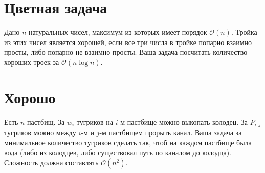 \documentclass[addpoints]{exam}
\begin{document}
\section{Цветная задача}

Дано $n$ натуральных чисел, максимум из которых имеет порядок $\mathcal{O}(n)$. Тройка из этих чисел является хорошей, если все три числа в тройке попарно взаимно просты, либо попарно не взаимно просты. Ваша задача посчитать количество хороших троек за $\mathcal{O}(n \log{n})$.

\section{Хорошо}

Есть $n$ пастбищ. За $w_i$ тугриков на $i$-м пастбище можно выкопать колодец. За $P_{i,j}$ тугриков можно между $i$-м и $j$-м пастбищем прорыть канал. Ваша задача за минимальное количество тугриков сделать так, чтоб на каждом пастбище была вода (либо из колодцев, либо существовал путь по каналом до колодца). Сложность должна составлять $\mathcal{O}(n^2)$.
\end{document}
